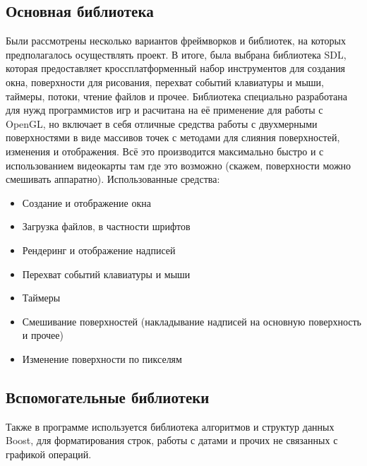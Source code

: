 \documentclass[a4paper,12pt]{report}
\begin{document}
\subsection{Основная библиотека}
Были рассмотрены несколько вариантов фреймворков и библиотек, на которых предполагалось осуществлять проект. В итоге, была выбрана библиотека SDL, которая предоставляет кроссплатформенный набор инструментов для создания окна, поверхности для рисования, перехват событий клавиатуры и мыши, таймеры, потоки, чтение файлов и прочее. Библиотека специально разработана для нужд программистов игр и расчитана на её применение для работы с OpenGL, но включает в себя отличные средства работы с двухмерными поверхностями в виде массивов точек с методами для слияния поверхностей, изменения и отображения. Всё это производится максимально быстро и с использованием видеокарты там где это возможно (скажем, поверхности можно смешивать аппаратно). Использованные средства:
\begin{itemize}
\item Создание и отображение окна
\item Загрузка файлов, в частности шрифтов
\item Рендеринг и отображение надписей
\item Перехват событий клавиатуры и мыши
\item Таймеры
\item Смешивание поверхностей (накладывание надписей на основную поверхность и прочее)
\item Изменение поверхности по пикселям
\end{itemize}

\subsection{Вспомогательные библиотеки}
Также в программе используется библиотека алгоритмов и структур данных Boost, для форматирования строк, работы с датами и прочих не связанных с графикой операций.
\end{document}
